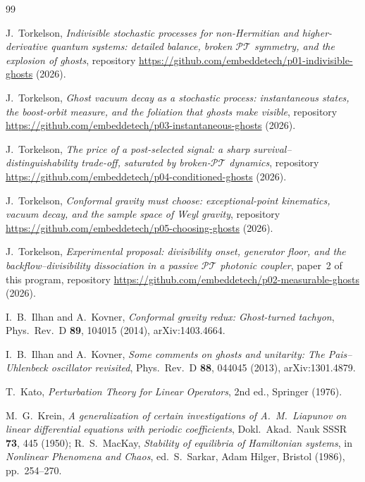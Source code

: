 ﻿\documentclass[11pt]{article}
\newcommand{\PT}{\mathcal{PT}}
\theoremstyle{remark}
\begin{document}
\begin{thebibliography}{99}\small

J.~Torkelson,
\emph{Indivisible stochastic processes for non-Hermitian and
higher-derivative quantum systems: detailed balance, broken $\PT$
symmetry, and the explosion of ghosts},
repository \url{https://github.com/embeddetech/p01-indivisible-ghosts}
(2026).

J.~Torkelson,
\emph{Ghost vacuum decay as a stochastic process: instantaneous
states, the boost-orbit measure, and the foliation that ghosts make
visible}, repository
\url{https://github.com/embeddetech/p03-instantaneous-ghosts} (2026).

J.~Torkelson,
\emph{The price of a post-selected signal: a sharp
survival--distinguishability trade-off, saturated by broken-$\PT$
dynamics}, repository
\url{https://github.com/embeddetech/p04-conditioned-ghosts} (2026).

J.~Torkelson,
\emph{Conformal gravity must choose: exceptional-point kinematics,
vacuum decay, and the sample space of Weyl gravity}, repository
\url{https://github.com/embeddetech/p05-choosing-ghosts} (2026).

J.~Torkelson,
\emph{Experimental proposal: divisibility onset, generator floor,
and the backflow--divisibility dissociation in a passive $\PT$
photonic coupler}, paper~2 of this program, repository
\url{https://github.com/embeddetech/p02-measurable-ghosts} (2026).

I.~B.~Ilhan and A.~Kovner,
\emph{Conformal gravity redux: Ghost-turned tachyon},
Phys.\ Rev.\ D \textbf{89}, 104015 (2014), arXiv:1403.4664.

I.~B.~Ilhan and A.~Kovner,
\emph{Some comments on ghosts and unitarity: The Pais--Uhlenbeck
oscillator revisited},
Phys.\ Rev.\ D \textbf{88}, 044045 (2013), arXiv:1301.4879.

T.~Kato,
\emph{Perturbation Theory for Linear Operators},
2nd ed., Springer (1976).

M.~G.~Krein,
\emph{A generalization of certain investigations of A.~M.~Liapunov
on linear differential equations with periodic coefficients},
Dokl.\ Akad.\ Nauk SSSR \textbf{73}, 445 (1950);
R.~S.~MacKay,
\emph{Stability of equilibria of Hamiltonian systems},
in \emph{Nonlinear Phenomena and Chaos}, ed.\ S.~Sarkar,
Adam Hilger, Bristol (1986), pp.~254--270.


\end{thebibliography}
\end{document}
